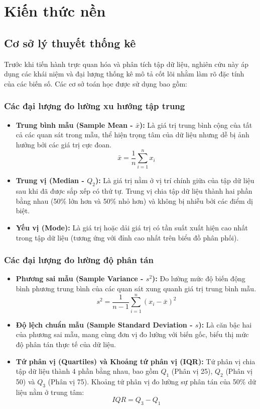 \documentclass[12pt, a4paper]{article}
\begin{document}
\section{Kiến thức nền}
\subsection{Cơ sở lý thuyết thống kê}

Trước khi tiến hành trực quan hóa và phân tích tập dữ liệu, nghiên cứu này áp dụng các khái niệm và đại lượng thống kê mô tả cốt lõi nhằm làm rõ đặc tính của các biến số. Các cơ sở toán học được sử dụng bao gồm:

\subsubsection{Các đại lượng đo lường xu hướng tập trung}
\begin{itemize}
    \item \textbf{Trung bình mẫu (Sample Mean - $\bar{x}$):} Là giá trị trung bình cộng của tất cả các quan sát trong mẫu, thể hiện trọng tâm của dữ liệu nhưng dễ bị ảnh hưởng bởi các giá trị cực đoan.
    $$ \bar{x} = \frac{1}{n} \sum_{i=1}^{n} x_i $$
    \item \textbf{Trung vị (Median - $Q_2$):} Là giá trị nằm ở vị trí chính giữa của tập dữ liệu sau khi đã được sắp xếp có thứ tự. Trung vị chia tập dữ liệu thành hai phần bằng nhau (50\% lớn hơn và 50\% nhỏ hơn) và không bị nhiễu bởi các điểm dị biệt.
    \item \textbf{Yếu vị (Mode):} Là giá trị hoặc dải giá trị có tần suất xuất hiện cao nhất trong tập dữ liệu (tương ứng với đỉnh cao nhất trên biểu đồ phân phối).
\end{itemize}

\subsubsection{Các đại lượng đo lường độ phân tán}
\begin{itemize}
    \item \textbf{Phương sai mẫu (Sample Variance - $s^2$):} Đo lường mức độ biến động bình phương trung bình của các quan sát xung quanh giá trị trung bình mẫu.
    $$ s^2 = \frac{1}{n-1} \sum_{i=1}^{n} (x_i - \bar{x})^2 $$
    \item \textbf{Độ lệch chuẩn mẫu (Sample Standard Deviation - $s$):} Là căn bậc hai của phương sai mẫu, mang cùng đơn vị đo lường với biến gốc, biểu thị mức độ phân tán thực tế của dữ liệu.
    \item \textbf{Tứ phân vị (Quartiles) và Khoảng tứ phân vị (IQR):} Tứ phân vị chia tập dữ liệu thành 4 phần bằng nhau, bao gồm $Q_1$ (Phân vị 25), $Q_2$ (Phân vị 50) và $Q_3$ (Phân vị 75). Khoảng tứ phân vị đo lường sự phân tán của 50\% dữ liệu nằm ở trung tâm:
    $$ IQR = Q_3 - Q_1 $$
\end{itemize}
\end{document}
